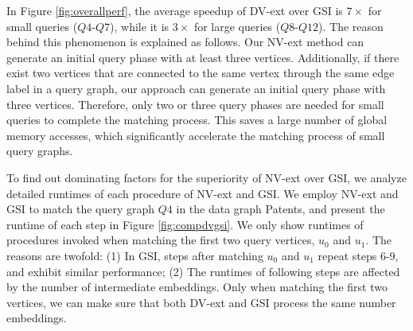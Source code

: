 In Figure \ref{fig:overallperf}, the average speedup of DV-ext over GSI is $7\times$ for small queries ($Q4$-$Q7$), while it is $3\times$ for large queries ($Q8$-$Q12$). The reason behind this phenomenon is explained as follows. Our NV-ext method can generate an initial query phase with at least three vertices. Additionally, if there exist two vertices that are connected to the same vertex through the same edge label in a query graph, our approach can generate an initial query phase with three vertices. Therefore, only two or three query phases are needed for small queries to complete the matching process. This saves a large number of global memory accesses, which significantly accelerate the matching process of small query graphs.

To find out dominating factors for the superiority of NV-ext over GSI, we analyze detailed runtimes of each procedure of NV-ext and GSI. We employ NV-ext and GSI to match the query graph $Q4$ in the data graph Patents, and present the runtime of each step in Figure \ref{fig:compdvgsi}. We only show runtimes of procedures invoked when matching the first two query vertices, $u_0$ and $u_1$. The reasons are twofold: (1) In GSI, steps after matching $u_0$ and $u_1$ repeat steps 6-9, and exhibit similar performance; (2) The runtimes of following steps are affected by the number of intermediate embeddings. Only when matching the first two vertices, we can make sure that both DV-ext and GSI process the same number embeddings.

